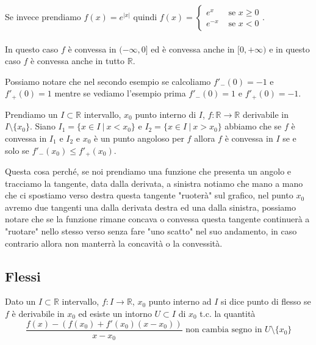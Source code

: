 \begin{example}
Se invece prendiamo $f(x) = e^{|x|}$ quindi $f(x) = \begin{cases}e^x & \text{ se } x\geq 0 \\e^{-x} & \text{ se } x< 0 \end{cases}$.\\\\
In questo caso $f$ è convessa in $(-\infty, 0]$ ed è convessa anche in $[0, +\infty)$ e in questo caso $f$ è convessa anche in tutto $\mathbb{R}$.
\end{example}

\hspace{-15pt}Possiamo notare che nel secondo esempio se calcoliamo $f'_-(0) = -1$ e $f'_+(0) = 1$ mentre se vediamo l'esempio prima $f'_-(0) = 1$ e $f'_+(0) = -1$.

\begin{proposition}
Prendiamo un $I \subset \mathbb{R}$ intervallo, $x_0$ punto interno di $I$, $f:\mathbb{R} \to \mathbb{R}$ derivabile in $I \setminus \{x_0\}$. Siano $I_1 = \{x \in I \: |\: x<x_0\}$ e $I_2 = \{x\in I \: |\: x > x_0\}$ abbiamo che se $f$ è convessa in $I_1$ e $I_2$ e $x_0$ è un punto angoloso per $f$ allora $f$ è convessa in $I$ se e solo se $f'_-(x_0) \leq f'_+(x_0)$.
\end{proposition}

\hspace{-15pt}Questa cosa perché, se noi prendiamo una funzione che presenta un angolo e tracciamo la tangente, data dalla derivata, a sinistra notiamo che mano a mano che ci spostiamo verso destra questa tangente "ruoterà" sul grafico, nel punto $x_0$ avremo due tangenti una dalla derivata destra ed una dalla sinistra, possiamo notare che se la funzione rimane concava o convessa questa tangente continuerà a "ruotare" nello stesso verso senza fare "uno scatto" nel suo andamento, in caso contrario allora non manterrà la concavità o la convessità.

\subsection{Flessi}
\begin{definition}[Flesso]
Dato un $I\subset \mathbb{R}$ intervallo, $f: I\to \mathbb{R}$, $x_0$ punto interno ad $I$ si dice punto di flesso se $f$ è derivabile in $x_0$ ed esiste un intorno $U \subset I$ di $x_0$ t.c. la quantità
\[\frac{f(x) - (f(x_0) + f'(x_0)(x-x_0))}{x-x_0} \text{ non cambia segno in }U \setminus \{x_0\}\]
\end{definition}

